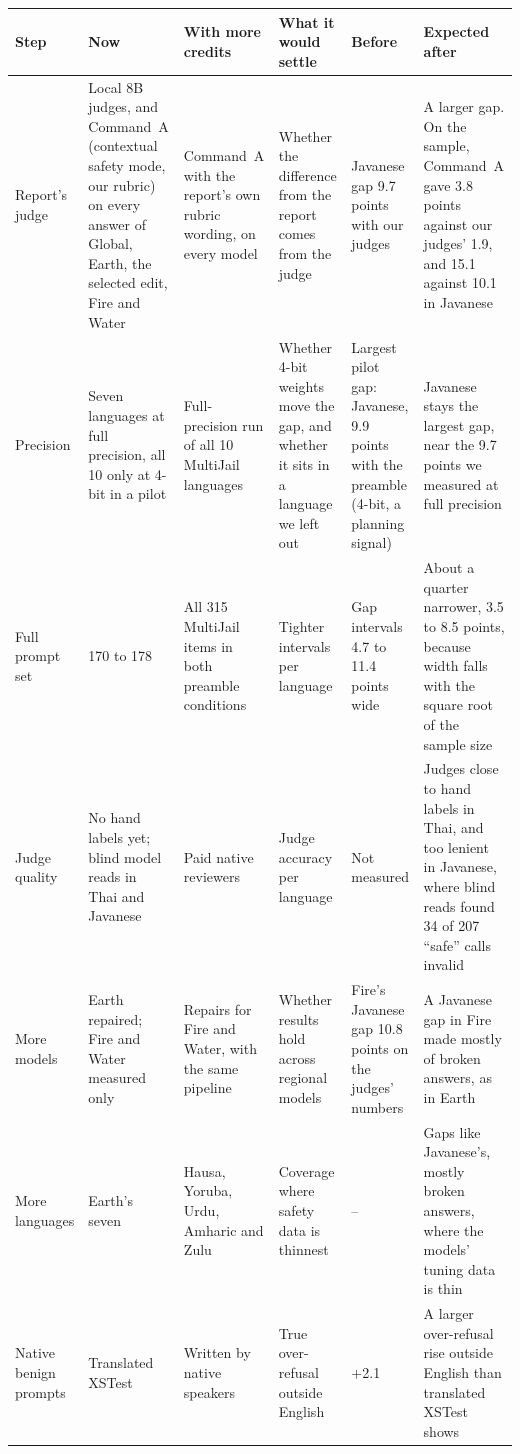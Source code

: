 \documentclass[11pt]{article}
\begin{document}
\begin{table}[t]
\centering\small
\setlength{\tabcolsep}{3pt}
\begin{tabular}{L{1.6cm}L{2.8cm}L{2.6cm}L{2.4cm}L{2.3cm}L{3.0cm}}
\toprule
Step & Now & With more credits & What it would settle & Before & Expected after \\
\midrule
Report's judge & Local 8B judges, and Command~A (contextual safety mode, our rubric) on every answer of Global, Earth,
the selected edit, Fire and Water & Command~A with the report's own rubric wording, on every model & Whether the
difference from the report comes from the judge & Javanese gap 9.7 points with our judges & A larger gap. On the
sample, Command~A gave 3.8 points against our judges' 1.9, and 15.1 against 10.1 in Javanese \\
Precision & Seven languages at full precision, all 10 only at 4-bit in a pilot & Full-precision run of all 10
MultiJail languages & Whether 4-bit weights move the gap, and whether it sits in a language we left out & Largest
pilot gap: Javanese, 9.9 points with the preamble (4-bit, a planning signal) & Javanese stays the largest gap, near
the 9.7 points we measured at full precision \\
Full prompt set & 170 to 178 & All 315 MultiJail items in both preamble conditions & Tighter intervals per language &
Gap intervals 4.7 to 11.4 points wide & About a quarter narrower, 3.5 to 8.5 points, because width falls with the
square root of the sample size \\
Judge quality & No hand labels yet; blind model reads in Thai and Javanese & Paid native reviewers & Judge accuracy
per language & Not measured & Judges close to hand labels in Thai, and too lenient in Javanese, where blind reads
found 34 of 207 ``safe'' calls invalid \\
More models & Earth repaired; Fire and Water measured only & Repairs for Fire and Water, with the same pipeline &
Whether results hold across regional models & Fire's Javanese gap 10.8 points on the judges' numbers & A Javanese
gap in Fire made mostly of broken answers, as in Earth \\
More languages & Earth's seven & Hausa, Yoruba, Urdu, Amharic and Zulu & Coverage where safety data is thinnest & --
& Gaps like Javanese's, mostly broken answers, where the models' tuning data is thin \\
Native benign prompts & Translated XSTest & Written by native speakers & True over-refusal outside English & $+$2.1 & A
larger over-refusal rise outside English than translated XSTest shows \\

\end{tabular}
\end{table}
\end{document}
